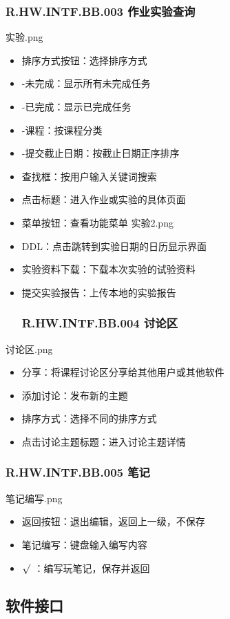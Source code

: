     \subsubsection{R.HW.INTF.BB.003 作业实验查询}
    实验.png
    \begin{itemize}
  \item  排序方式按钮：选择排序方式
  \item -未完成：显示所有未完成任务
  \item -已完成：显示已完成任务
  \item -课程：按课程分类
  \item -提交截止日期：按截止日期正序排序
  \item 查找框：按用户输入关键词搜索
  \item 点击标题：进入作业或实验的具体页面
  \item 菜单按钮：查看功能菜单
  实验2.png
  \item DDL：点击跳转到实验日期的日历显示界面
  \item 实验资料下载：下载本次实验的试验资料
  \item 提交实验报告：上传本地的实验报告
    \subsubsection{R.HW.INTF.BB.004 讨论区}
    \end{itemize}
    讨论区.png
    \begin{itemize}
  \item 分享：将课程讨论区分享给其他用户或其他软件
  \item 添加讨论：发布新的主题
  \item 排序方式：选择不同的排序方式
  \item 点击讨论主题标题：进入讨论主题详情
  \end{itemize}
    \subsubsection{R.HW.INTF.BB.005 笔记}
    笔记编写.png
    \begin{itemize}
  \item 返回按钮：退出编辑，返回上一级，不保存
  \item 笔记编写：键盘输入编写内容
  \item $\surd$ ：编写玩笔记，保存并返回
  \end{itemize}


  \subsection{软件接口}

